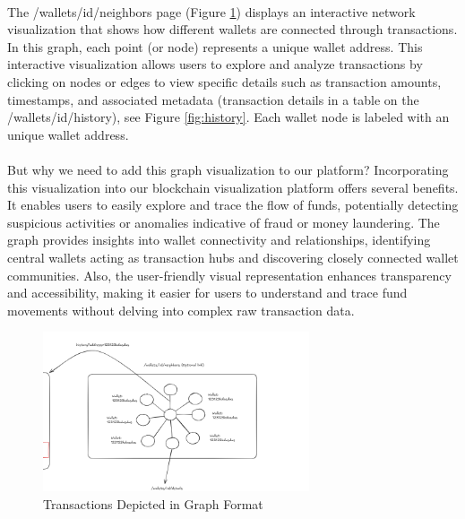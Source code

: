 \paragraph{} The /wallets/id/neighbors page (Figure \ref{fig:graph}) displays an interactive network visualization that shows how different wallets are connected through transactions. In this graph, each point (or node) represents a unique wallet address.  This interactive visualization allows users to explore and analyze transactions by clicking on nodes or edges to view specific details such as transaction amounts, timestamps, and associated metadata (transaction details in a table on the /wallets/id/history), see Figure \ref{fig:history}. Each wallet node is labeled with an unique wallet address.

\paragraph{}But why we need to add this graph visualization to our platform? Incorporating this visualization into our blockchain visualization platform offers several benefits. It enables users to easily explore and trace the flow of funds, potentially detecting suspicious activities or anomalies indicative of fraud or money laundering. The graph provides insights into wallet connectivity and relationships, identifying central wallets acting as transaction hubs and discovering closely connected wallet communities. Also, the user-friendly visual representation enhances transparency and accessibility, making it easier for users to understand and trace fund movements without delving into complex raw transaction data.

\begin{figure}[H]
    \centering
    \includegraphics[width= 0.7\textwidth]{root/graph.png}
     \caption{Transactions Depicted in Graph Format}
    \label{fig:graph}
\end{figure}





 
 

